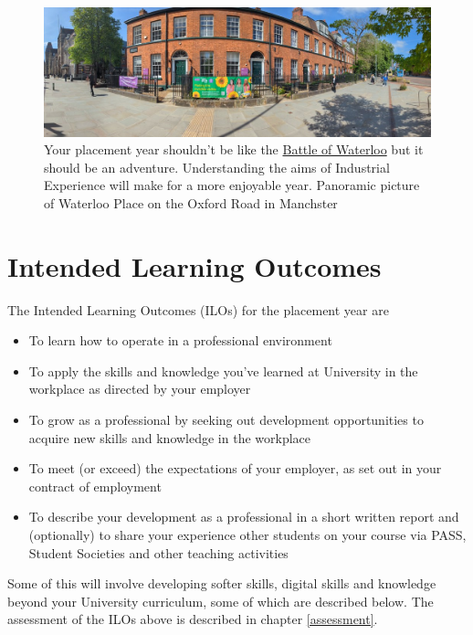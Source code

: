 \documentclass[
]{book}
\providecommand{\tightlist}{%
  \setlength{\itemsep}{0pt}\setlength{\parskip}{0pt}}
\begin{document}
\begin{figure}

{\centering \includegraphics[width=1\linewidth]{images/waterloo} 

}

\caption{Your placement year shouldn't be like the \href{https://en.wikipedia.org/wiki/Battle_of_Waterloo}{Battle of Waterloo} but it should be an adventure. Understanding the aims of Industrial Experience will make for a more enjoyable year. Panoramic picture of Waterloo Place on the Oxford Road in Manchster}\label{fig:aims-fig}
\end{figure}



\section{Intended Learning Outcomes}\label{ilos}

The Intended Learning Outcomes (ILOs) for the placement year are

\begin{itemize}
\tightlist
\item
  To learn how to operate in a professional environment
\item
  To apply the skills and knowledge you've learned at University in the workplace as directed by your employer
\item
  To grow as a professional by seeking out development opportunities to acquire new skills and knowledge in the workplace
\item
  To meet (or exceed) the expectations of your employer, as set out in your contract of employment
\item
  To describe your development as a professional in a short written report and (optionally) to share your experience other students on your course via PASS, Student Societies and other teaching activities
\end{itemize}

Some of this will involve developing softer skills, digital skills and knowledge beyond your University curriculum, some of which are described below. The assessment of the ILOs above is described in chapter \ref{assessment}.
\end{document}
